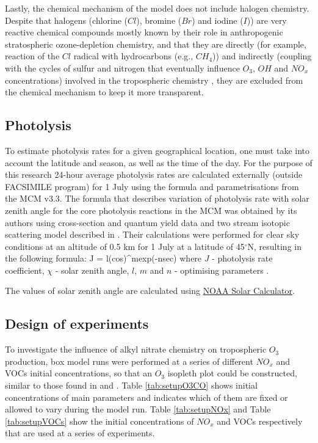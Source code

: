 \documentclass[11pt,a4paper]{article}
\newcounter{matriz}
\newenvironment{matriz}{\refstepcounter{matriz}\equation}{\tag{\thematriz}\endequation}
\begin{document}
Lastly, the chemical mechanism of the model does not include halogen chemistry. Despite that halogens (chlorine ($Cl$), bromine ($Br$) and iodine ($I$)) are very reactive chemical compounds mostly known by their role in anthropogenic stratospheric ozone-depletion chemistry, and that they are directly (for example, reaction of the $Cl$ radical with hydrocarbons (e.g., $CH_4$)) and indirectly (coupling with the cycles of sulfur and nitrogen that eventually influence $O_3$, $OH$ and $NO_x$ concentrations) involved in the tropospheric chemistry \citep{VonGlasow2014,Platt2003}, they are excluded from the chemical mechanism to keep it more transparent.
\subsection{Photolysis}\label{sec:method_photolysis}
To estimate photolysis rates for a given geographical location, one must take into account the latitude and season, as well as the time of the day. For the purpose of this research 24-hour average photolysis rates are calculated externally (outside FACSIMILE program) for 1 July using the formula and parametrisations from the MCM v3.3. The formula that describes variation of photolysis rate with solar zenith angle for the core photolysis reactions in the MCM was obtained by its authors using cross-section and quantum yield data and two stream isotopic scattering model described in \citep{Hayman1997}. Their calculations were performed for clear sky conditions at an altitude of 0.5 km for 1 July at a latitude of 45$^{\circ}$N, resulting in the following formula:
\begin{matriz} \label{eq:MCMphotolysis}
J = l(cos\chi)^mexp(-nsec\chi)
\end{matriz}
where $J$ - photolysis rate coefficient, $\chi$ - solar zenith angle, $l$, $m$ and $n$ - optimising parameters \citep{Jenkin1997,Saunders2003}.

The values of solar zenith angle are calculated using \href{http://www.esrl.noaa.gov/gmd/grad/solcalc/}{NOAA Solar Calculator}.

\subsection{Design of experiments}\label{sec:method_expdesign}
To investigate the influence of alkyl nitrate chemistry on tropospheric $O_3$ production, box model runs were performed at a series of different $NO_x$ and VOCs initial concentrations, so that an $O_3$ isopleth plot could be constructed, similar to those found in \citep{Dodge1977} and \citep{Sillman1999}.   Table \ref{tab:setupO3CO} shows initial concentrations of main parameters and indicates which of them are fixed or allowed to vary during the model run. Table \ref{tab:setupNOx} and Table \ref{tab:setupVOCs} show the initial concentrations of $NO_x$ and VOCs respectively that are used at a series of experiments.
\end{document}
